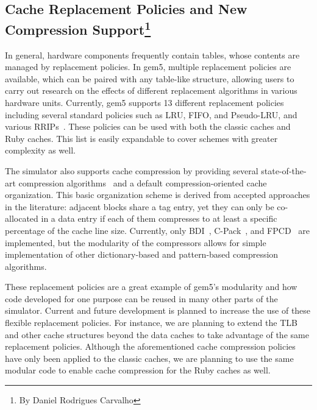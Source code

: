 \subsection[Cache Replacement Policies and New Compression Support]{Cache Replacement Policies and New Compression Support\footnote{By Daniel Rodrigues Carvalho}}

In general, hardware components frequently contain tables, whose contents are managed by replacement policies.
In gem5, multiple replacement policies are available, which can be paired with any table-like structure, allowing users to carry out research on the effects of different replacement algorithms in various hardware units.
Currently, gem5 supports 13 different replacement policies including several standard policies such as LRU, FIFO, and Pseudo-LRU, and various RRIPs~\cite{Jaleel2010rrip}.
These policies can be used with both the classic caches and Ruby caches.
This list is easily expandable to cover schemes with greater complexity as well.

The simulator also supports cache compression by providing several state-of-the-art compression algorithms~\cite{sardashti2015primer} and a default compression-oriented cache organization.
This basic organization scheme is derived from accepted approaches in the literature: adjacent blocks share a tag entry, yet they can only be co-allocated in a data entry if each of them compresses to at least a specific percentage of the cache line size.
Currently, only BDI~\cite{pekhimenko2012base}, C-Pack~\cite{chen2010c}, and FPCD~\cite{alameldeen2018opportunistic} are implemented, but the modularity of the compressors allows for simple implementation of other dictionary-based and pattern-based compression algorithms.

These replacement policies are a great example of gem5's modularity and how code developed for one purpose can be reused in many other parts of the simulator.
Current and future development is planned to increase the use of these flexible replacement policies.
For instance, we are planning to extend the TLB and other cache structures beyond the data caches to take advantage of the same replacement policies.
Although the aforementioned cache compression policies have only been applied to the classic caches, we are planning to use the same modular code to enable cache compression for the Ruby caches as well.
